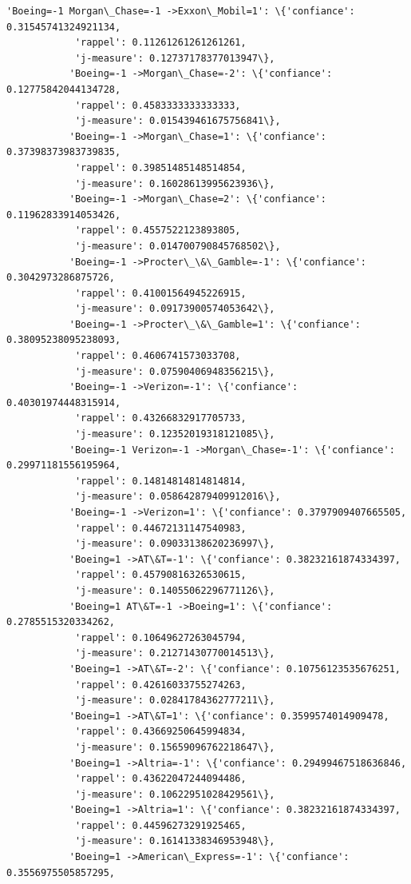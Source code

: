 \documentclass[11pt]{article}
\begin{document}
\begin{Verbatim}[commandchars=\\\{\}]
           'Boeing=-1 Morgan\_Chase=-1 ->Exxon\_Mobil=1': \{'confiance': 0.31545741324921134,
            'rappel': 0.11261261261261261,
            'j-measure': 0.12737178377013947\},
           'Boeing=-1 ->Morgan\_Chase=-2': \{'confiance': 0.12775842044134728,
            'rappel': 0.4583333333333333,
            'j-measure': 0.015439461675756841\},
           'Boeing=-1 ->Morgan\_Chase=1': \{'confiance': 0.37398373983739835,
            'rappel': 0.39851485148514854,
            'j-measure': 0.16028613995623936\},
           'Boeing=-1 ->Morgan\_Chase=2': \{'confiance': 0.11962833914053426,
            'rappel': 0.4557522123893805,
            'j-measure': 0.014700790845768502\},
           'Boeing=-1 ->Procter\_\&\_Gamble=-1': \{'confiance': 0.3042973286875726,
            'rappel': 0.41001564945226915,
            'j-measure': 0.09173900574053642\},
           'Boeing=-1 ->Procter\_\&\_Gamble=1': \{'confiance': 0.38095238095238093,
            'rappel': 0.4606741573033708,
            'j-measure': 0.07590406948356215\},
           'Boeing=-1 ->Verizon=-1': \{'confiance': 0.40301974448315914,
            'rappel': 0.43266832917705733,
            'j-measure': 0.12352019318121085\},
           'Boeing=-1 Verizon=-1 ->Morgan\_Chase=-1': \{'confiance': 0.29971181556195964,
            'rappel': 0.14814814814814814,
            'j-measure': 0.058642879409912016\},
           'Boeing=-1 ->Verizon=1': \{'confiance': 0.3797909407665505,
            'rappel': 0.44672131147540983,
            'j-measure': 0.09033138620236997\},
           'Boeing=1 ->AT\&T=-1': \{'confiance': 0.38232161874334397,
            'rappel': 0.45790816326530615,
            'j-measure': 0.14055062296771126\},
           'Boeing=1 AT\&T=-1 ->Boeing=1': \{'confiance': 0.2785515320334262,
            'rappel': 0.10649627263045794,
            'j-measure': 0.21271430770014513\},
           'Boeing=1 ->AT\&T=-2': \{'confiance': 0.10756123535676251,
            'rappel': 0.42616033755274263,
            'j-measure': 0.02841784362777211\},
           'Boeing=1 ->AT\&T=1': \{'confiance': 0.3599574014909478,
            'rappel': 0.43669250645994834,
            'j-measure': 0.15659096762218647\},
           'Boeing=1 ->Altria=-1': \{'confiance': 0.29499467518636846,
            'rappel': 0.43622047244094486,
            'j-measure': 0.10622951028429561\},
           'Boeing=1 ->Altria=1': \{'confiance': 0.38232161874334397,
            'rappel': 0.44596273291925465,
            'j-measure': 0.16141338346953948\},
           'Boeing=1 ->American\_Express=-1': \{'confiance': 0.3556975505857295,

\end{Verbatim}
\end{document}
